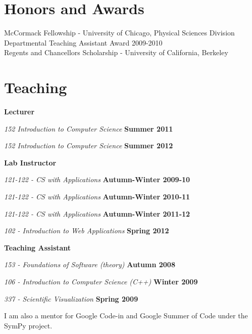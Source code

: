 \documentclass[margin,line]{res}
\newenvironment{list1}{
  \begin{list}{\ding{113}}{%
      \setlength{\itemsep}{0in}
      \setlength{\parsep}{0in} \setlength{\parskip}{0in}
      \setlength{\topsep}{0in} \setlength{\partopsep}{0in} 
      \setlength{\leftmargin}{0.17in}}}{\end{list}}
\begin{document}
\begin{resume}
\section{\sc Honors and Awards} 

McCormack Fellowship - University of Chicago, Physical Sciences Division\\
Departmental Teaching Assistant Award 2009-2010\\
Regents and Chancellors Scholarship - University of California, Berkeley\\

\section {\sc Teaching}

{\bf Lecturer}
\begin{list1}
\item[] {\em 152 Introduction to Computer Science} \hfill {\bf Summer 2011}
\item[] {\em 152 Introduction to Computer Science} \hfill {\bf Summer 2012}
\end{list1}

{\bf Lab Instructor}
\begin{list1}
\item[] {\em 121-122 - CS with Applications}  \hfill {\bf Autumn-Winter 2009-10}
\item[] {\em 121-122 - CS with Applications}  \hfill {\bf Autumn-Winter 2010-11}
\item[] {\em 121-122 - CS with Applications}  \hfill {\bf Autumn-Winter 2011-12}
\item[] {\em 102 - Introduction to Web Applications}  \hfill {\bf Spring 2012}
\end{list1}

{\bf Teaching Assistant}
\begin{list1}
\item[] {\em 153 - Foundations of Software (theory)} \hfill {\bf Autumn 2008}
\item[] {\em 106 - Introduction to Computer Science (C++)} \hfill {\bf Winter 2009}
\item[] {\em 337 - Scientific Visualization} \hfill {\bf Spring 2009}
\end{list1}

I am also a mentor for Google Code-in and Google Summer of Code under the SymPy project. 


\end{resume}
\end{document}
